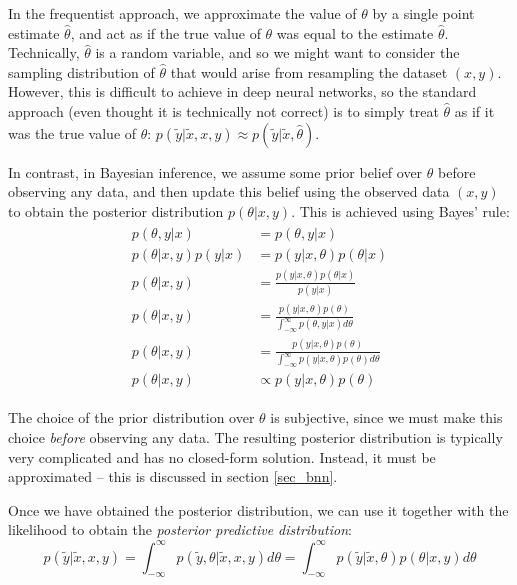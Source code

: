 \documentclass[12pt]{article}
\begin{document}
In the frequentist approach, we approximate the value of $\theta$ by a single point estimate $\hat{\theta}$, and act as if the true value of $\theta$ was equal to the estimate $\hat{\theta}$. Technically, $\hat{\theta}$ is a random variable, and so we might want to consider the sampling distribution of $\hat{\theta}$ that would arise from resampling the dataset $(x, y)$. However, this is difficult to achieve in deep neural networks, so the standard approach (even thought it is technically not correct) is to simply treat $\hat{\theta}$ as if it was the true value of $\theta$: $p(\tilde{y} | \tilde{x}, x, y) \approx p(\tilde{y} | \tilde{x}, \hat{\theta})$.

In contrast, in Bayesian inference, we assume some prior belief over $\theta$ before observing any data, and then update this belief using the observed data $(x, y)$ to obtain the posterior distribution $p(\theta | x, y)$. This is achieved using Bayes' rule:
\begin{align}
\begin{split}
p(\theta,y|x) &= p(\theta,y|x) \\
p(\theta|x,y)p(y|x) &= p(y|x,\theta)p(\theta|x)\\
p(\theta|x,y) &= \frac{p(y|x,\theta)p(\theta|x)}{p(y|x)}\\
p(\theta|x,y) &= \frac{p(y|x,\theta)p(\theta)}{\int_{-\infty}^\infty p(\theta, y|x) d\theta}\\
p(\theta|x,y) &= \frac{p(y|x,\theta)p(\theta)}{\int_{-\infty}^\infty p(y|x,\theta)p(\theta) d\theta}\\
p(\theta|x,y) &\propto p(y|x,\theta)p(\theta)
\end{split}
\label{eq_posterior}
\end{align}

The choice of the prior distribution over $\theta$ is subjective, since we must make this choice \textit{before} observing any data. The resulting posterior distribution is typically very complicated and has no closed-form solution. Instead, it must be approximated -- this is discussed in section \ref{sec_bnn}.

Once we have obtained the posterior distribution, we can use it together with the likelihood to obtain the \textit{posterior predictive distribution}:
\begin{equation}
p(\tilde{y} | \tilde{x}, x, y) = \int_{-\infty}^\infty p(\tilde{y}, \theta | \tilde{x}, x, y) d\theta =   \int_{-\infty}^\infty p(\tilde{y} | \tilde{x}, \theta) p(\theta | x, y) d\theta
\label{eq_post_pred}
\end{equation}
\end{document}
